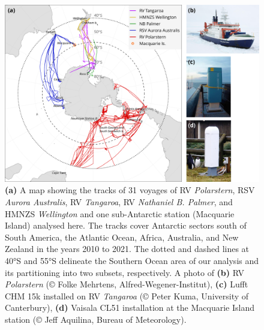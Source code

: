\documentclass[12pt,a4paper]{article}
\begin{document}
\begin{figure}
\centering
\includegraphics[width=\textwidth]{img/map_fig.png}
\caption{
\textbf{(a)} A map showing the tracks of 31 voyages of RV \emph{Polarstern},
RSV \emph{Aurora Australis}, RV \emph{Tangaroa}, RV \emph{Nathaniel B. Palmer},
and HMNZS \emph{Wellington} and one sub-Antarctic station (Macquarie Island)
analysed here. The tracks cover Antarctic sectors south of South America, the
Atlantic Ocean, Africa, Australia, and New Zealand in the years 2010 to 2021.
The dotted and dashed lines at 40°S and 55°S delineate the Southern
Ocean area of our analysis and its partitioning into two subsets, respectively.
A photo of \textbf{(b)} RV \emph{Polarstern} (© Folke Mehrtens,
Alfred-Wegener-Institut), \textbf{(c)} Lufft CHM 15k installed on RV
\emph{Tangaroa} (© Peter Kuma, University of Canterbury), \textbf{(d)} Vaisala
CL51 installation at the Macquarie Island station (© Jeﬀ Aquilina, Bureau of
Meteorology).
}
\label{fig:map}
\end{figure}
\end{document}

